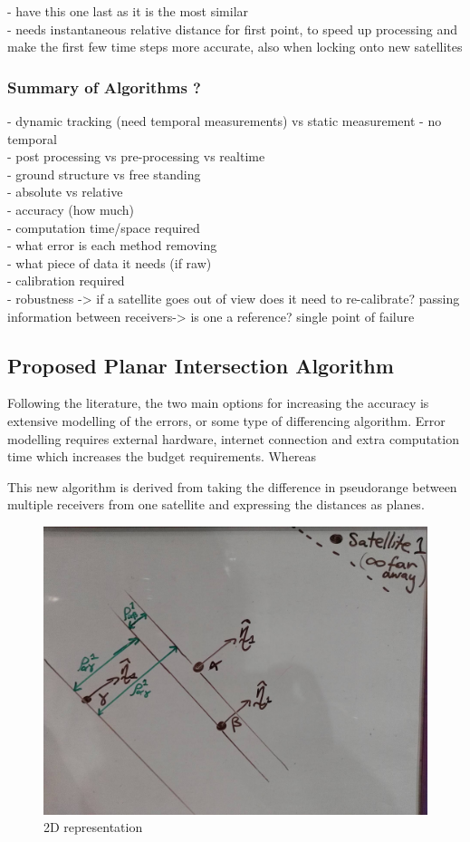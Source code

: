 \documentclass[11pt,a4paper]{article}
\begin{document}
- have this one last as it is the most similar\\
- needs instantaneous relative distance for first point, to speed up processing and make the first few time steps more accurate, also when locking onto new satellites


\subsubsection{Summary of Algorithms ?}

- dynamic tracking (need temporal measurements) vs static measurement - no temporal\\
- post processing vs pre-processing vs realtime\\
- ground structure vs free standing\\
- absolute vs relative\\
- accuracy (how much)\\
- computation time/space required\\
- what error is each method removing\\
- what piece of data it needs (if raw)\\
- calibration required\\
- robustness -> if a satellite goes out of view does it need to re-calibrate? passing information between receivers-> is one a reference? single point of failure



\subsection{Proposed Planar Intersection Algorithm}
Following the literature, the two main options for increasing the accuracy is extensive modelling of the errors, or some type of differencing algorithm. Error modelling requires external hardware, internet connection and extra computation time which increases the budget requirements. Whereas 



This new algorithm is derived from taking the difference in pseudorange between multiple receivers from one satellite and expressing the distances as planes.
\begin{figure}[h]
\centering
\caption{2D representation}
\label{fig:overall_singleS_multiR}
\includegraphics[width=0.7\linewidth]{overall_singleS_multiR}
\end{figure}
\end{document}
